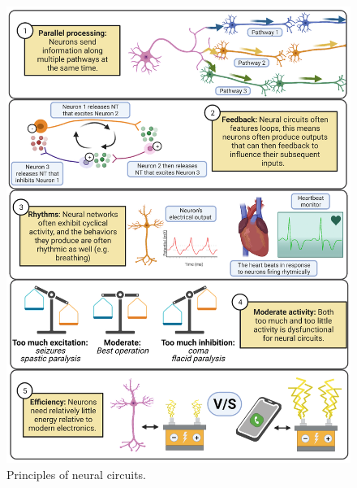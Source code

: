 \documentclass[
]{book}
\begin{document}
\begin{figure}

{\centering \includegraphics[width=0.9\linewidth]{images/ch02/02_08} 

}

\caption{Principles of neural circuits.}\label{fig:ch02-principles}
\end{figure}
\end{document}
